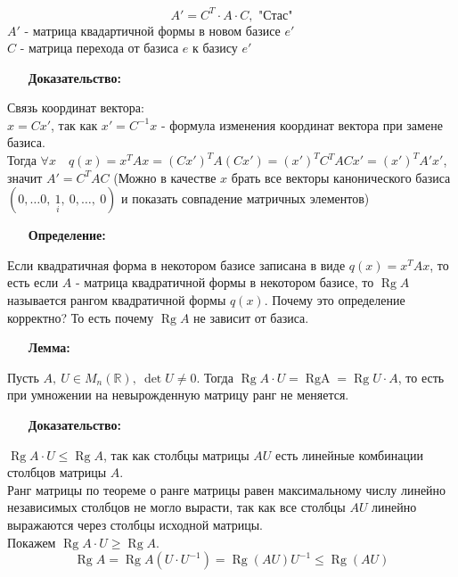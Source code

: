 \documentclass[12pt, letterpaper, twoside]{article}
\begin{document}
    \[A' = C^{T}\cdot A\cdot C,\text{ "Стас"}\]
    $A'$ - матрица квадартичной формы в новом базисе  $e'$\\
    $C$ - матрица перехода от базиса $e$ к базису $e'$

    \begin{enumerate}
        \item[\textbf{Доказательство:}]
    \end{enumerate}
    Связь координат вектора:\\
    $x = Cx'$, так как $x' = C^{-1} x$ - формула изменения координат вектора при замене базиса.\\
    Тогда $\forall x\quad q(x) = x^{T} A x = (Cx')^{T} A (C x') = (x')^T C^T A C x' = (x')^{T} A' x'$, значит $A' = C^{T}AC$ \big(Можно в качестве $x$ брать все векторы канонического базиса $(0,\dots 0,\ \underset{i}{1},\ 0,\dots,\ 0)$ и показать совпадение матричных элементов\big)
    \begin{enumerate}
        \item[\textbf{Определение:}]
    \end{enumerate}
    Если квадратичная форма в некотором базисе записана в виде $q(x) = x^{T} A x$, то есть если $A$ - матрица квадратичной формы в некотором базисе, то $\operatorname{Rg} A$ называется рангом квадратичной формы $q(x)$.
    Почему это определение корректно? То есть почему $\operatorname{Rg} A$ не зависит от базиса.
    \begin{enumerate}
        \item[\textbf{Лемма:}]
    \end{enumerate}
    Пусть $A,\ U\in M_n(\mathbb{R}),\ \det U\neq 0$. Тогда $\operatorname{Rg} A\cdot U = \operatorname{Rg A} = \operatorname{Rg} U\cdot A$, то есть при умножении на невырожденную матрицу ранг не меняется.
    \begin{enumerate}
        \item[\textbf{Доказательство:}] 
    \end{enumerate}
    $\operatorname{Rg} A\cdot U \leq \operatorname{Rg} A$, так как столбцы матрицы $AU$ есть линейные комбинации столбцов матрицы $A$.\\
    Ранг матрицы по теореме о ранге матрицы равен максимальному числу линейно независимых столбцов не могло вырасти, так как все столбцы $AU$ линейно выражаются через столбцы исходной матрицы.\\
    Покажем $\operatorname{Rg} A\cdot U\geq \operatorname{Rg} A$. \[\operatorname{Rg} A = \operatorname{Rg} A(U\cdot U^{-1}) = \operatorname{Rg} (AU)U^{-1} \leq \operatorname{Rg} (AU)\]
\end{document}
